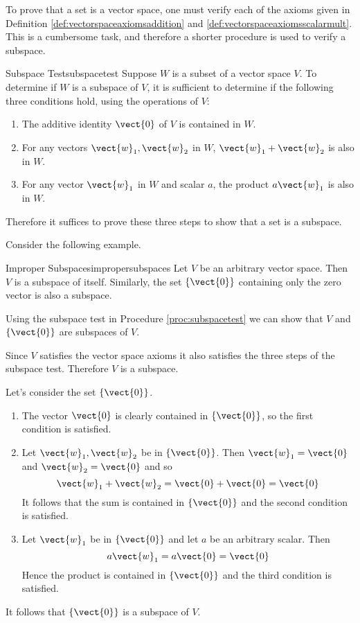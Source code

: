 To prove that a set is a vector space, one must verify each of the axioms given in Definition \ref{def:vectorspaceaxiomsaddition} and \ref{def:vectorspaceaxiomsscalarmult}. This is a cumbersome task, and therefore a shorter procedure is used to verify a subspace. 

\begin{procedure}{Subspace Test}{subspacetest}
Suppose $W$ is a subset of a vector space $V$. To determine if $W$ is a subspace of $V$, it is sufficient to determine if the following three conditions hold, using the operations of $V$: 
\begin{enumerate}
\item
The additive identity $\vect{0}$ of $V$ is contained in $W$.
\item
For any vectors $\vect{w}_1, \vect{w}_2$ in $W$, $\vect{w}_1 + \vect{w}_2$ is also in $W$.
\item
For any vector $\vect{w}_1$ in $W$ and scalar $a$,  the product $a\vect{w}_1$ is also in $W$. 
\end{enumerate}
\end{procedure}

Therefore it suffices to prove these three steps to show that a set is a subspace. 

Consider the following example.

\begin{example}{Improper Subspaces}{impropersubspaces}
Let $V$ be an arbitrary vector space. Then $V$ is a subspace of itself. Similarly, the set $\left\{ \vect{0} \right\}$ containing only the zero vector is also a subspace. 
\end{example}

\begin{solution}
Using the subspace test in Procedure \ref{proc:subspacetest} we can show that $V$ and $\left\{ \vect{0} \right\}$ are subspaces of $V$. 

Since $V$ satisfies the vector space axioms it also satisfies the three steps of the subspace test. Therefore $V$ is a subspace.

Let's consider the set $\left\{ \vect{0} \right\}$. 
\begin{enumerate}
\item
The vector $\vect{0}$ is clearly contained in  $\left\{ \vect{0} \right\}$, so the first condition is satisfied.

\item
Let $\vect{w}_1, \vect{w}_2$ be in  $\left\{ \vect{0} \right\}$. Then $\vect{w}_1 = \vect{0}$ and $\vect{w}_2 = \vect{0}$ and so 
\[
\vect{w}_1 + \vect{w}_2 = \vect{0} + \vect{0} = \vect{0}
\]
It follows that the sum is contained in $\left\{ \vect{0} \right\}$ and the second condition is satisfied. 

\item
Let $\vect{w}_1$ be in  $\left\{ \vect{0} \right\}$ and let $a$ be an arbitrary scalar. Then
\[
a\vect{w}_1  = a\vect{0} = \vect{0}
\]
Hence the product is contained in  $\left\{ \vect{0} \right\}$ and the third condition is satisfied. 
\end{enumerate}

It follows that  $\left\{ \vect{0} \right\}$ is a subspace of $V$. 
\end{solution}

